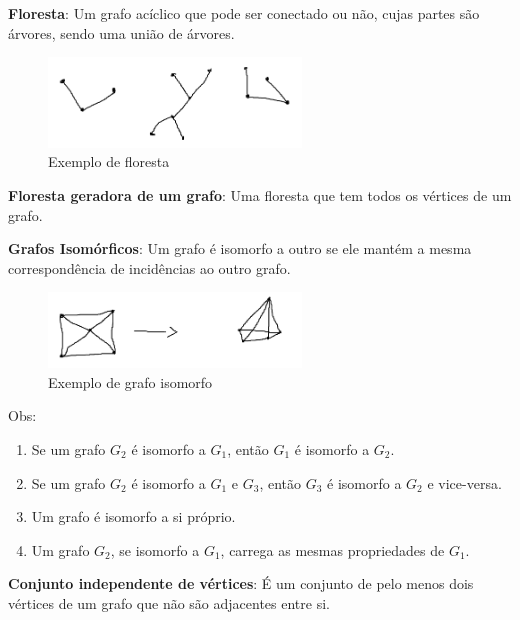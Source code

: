 \medskip

\textbf{Floresta}:
Um grafo acíclico que pode ser conectado ou não, cujas partes são árvores, sendo uma união de árvores.

\begin{figure}[H]
    \centering
    \includegraphics[width=0.6\textwidth]{figuras/Floresta.png}
    \caption{Exemplo de floresta}
\end{figure}

\textbf{Floresta geradora de um grafo}:
Uma floresta que tem todos os vértices de um grafo.

\medskip

\textbf{Grafos Isomórficos}:
Um grafo é isomorfo a outro se ele mantém a mesma correspondência de incidências ao outro grafo.

\begin{figure}[H]
    \centering
    \includegraphics[width=0.6\textwidth]{figuras/Grafoisomorfico.png}
    \caption{Exemplo de grafo isomorfo}
\end{figure}

Obs:
\begin{enumerate}
    \item Se um grafo $G_2$ é isomorfo a $G_1$, então $G_1$ é isomorfo a $G_2$.
    \item Se um grafo $G_2$ é isomorfo a $G_1$ e $G_3$, então $G_3$ é isomorfo a $G_2$ e vice-versa.
    \item Um grafo é isomorfo a si próprio.
    \item Um grafo $G_2$, se isomorfo a $G_1$, carrega as mesmas propriedades de $G_1$.
\end{enumerate}

\medskip

\textbf{Conjunto independente de vértices}:
É um conjunto de pelo menos dois vértices de um grafo que não são adjacentes entre si.

